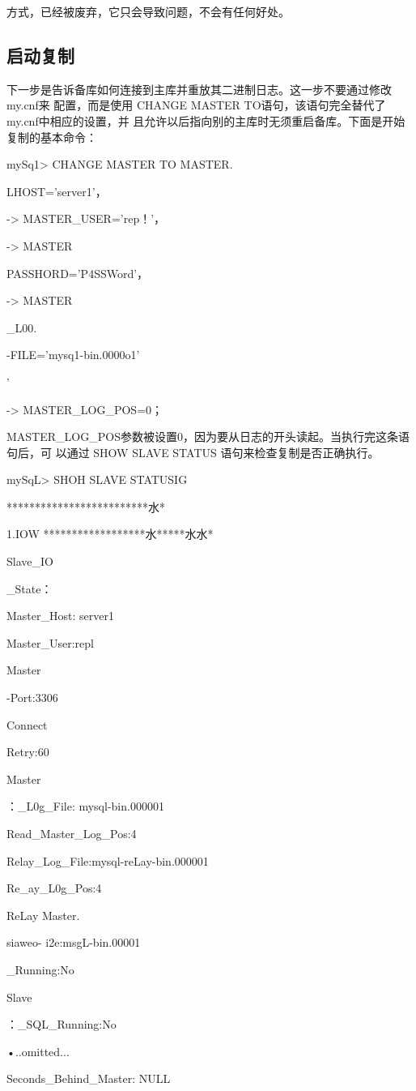 方式，已经被废弃，它只会导致问题，不会有任何好处。

\subsection{启动复制}
下一步是告诉备库如何连接到主库并重放其二进制日志。这一步不要通过修改 my.cnf来
配置，而是使用 CHANGE MASTER TO语句，该语句完全替代了 my.cnf中相应的设置，并
且允许以后指向别的主库时无须重启备库。下面是开始复制的基本命令：

mySq1> CHANGE MASTER TO MASTER.

LHOST='server1'，

-> MASTER\_USER='rep！'，

-> MASTER

PASSHORD='P4SSWord'，

-> MASTER

\_L00.

-FILE='mysq1-bin.0000o1'

’

-> MASTER\_LOG\_POS=0；

MASTER\_LOG\_POS参数被设置0，因为要从日志的开头读起。当执行完这条语句后，可
以通过 SHOW SLAVE STATUS 语句来检查复制是否正确执行。

mySqL> SHOH SLAVE STATUSIG

*************************水*

1.IOW ******************水*****水水*

Slave\_IO

\_State：

Master\_Host: server1

Master\_User:repl

Master

-Port:3306

Connect

Retry:60

Master

：\_L0g\_File: mysql-bin.000001

Read\_Master\_Log\_Pos:4

Relay\_Log\_File:mysql-reLay-bin.000001

Re\_ay\_L0g\_Pos:4

ReLay Master.

siaweo- i2e:msgL-bin.00001

\_Running:No

Slave

：\_SQL\_Running:No

•..omitted...

Seconds\_Behind\_Master: NULL

